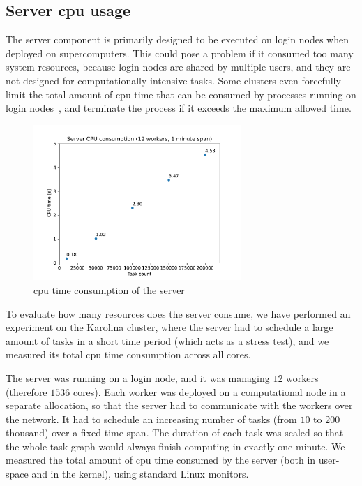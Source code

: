 
\subsection{Server \gls{cpu} usage}
The \hyperqueue{} server component is primarily designed to be executed on login nodes when
deployed on supercomputers. This could pose a problem if it consumed too many system resources,
because login nodes are shared by multiple users, and they are not designed for computationally
intensive tasks. Some clusters even forcefully limit the total amount of \gls{cpu}
time that can be consumed by processes running on login nodes~\cite{leonardo_time_limit}, and
terminate the process if it exceeds the maximum allowed time.

\begin{figure}[h]
	\centering
	\includegraphics[width=0.7\textwidth]{imgs/hq/charts/server-utilization-tasks}
	\caption{\gls{cpu} time consumption of the \hyperqueue{} server}
	\label{fig:hq-server-cpu-consumption}
\end{figure}

To evaluate how many resources does the server consume, we have performed an experiment on the
Karolina cluster, where the server had to schedule a large amount of tasks in a short time period
(which acts as a stress test), and we measured its total \gls{cpu} time consumption
across all cores.

The server was running on a login node, and it was managing $12$ workers
(therefore $1536$ cores). Each worker was deployed on a computational node in a
separate allocation, so that the server had to communicate with the workers over the network. It
had to schedule an increasing number of tasks (from $10$ to $200$
thousand) over a fixed time span. The duration of each task was scaled so that the whole task graph
would always finish computing in exactly one minute. We measured the total amount of
\gls{cpu} time consumed by the server (both in user-space and in the kernel), using
standard Linux monitors.

